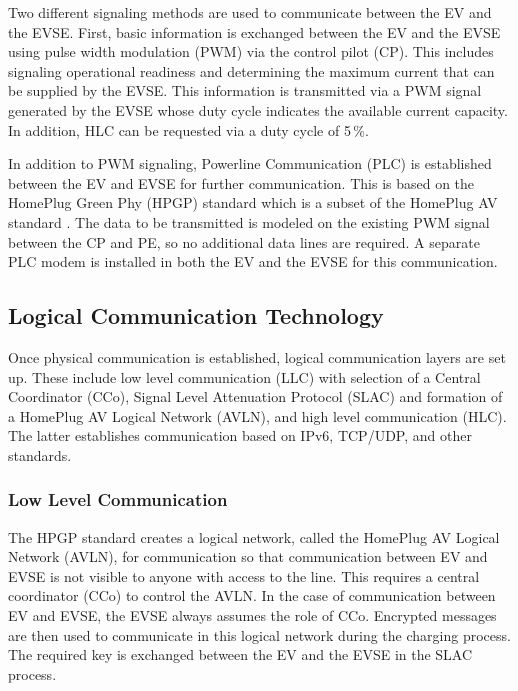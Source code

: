 \documentclass[sigconf]{acmart}
\begin{document}
Two different signaling methods are used to communicate between the EV and the EVSE. First, basic information is exchanged between the EV and the EVSE using pulse width modulation (PWM) via the control pilot (CP). This includes signaling operational readiness and determining the maximum current that can be supplied by the EVSE. This information is transmitted via a PWM signal generated by the EVSE whose duty cycle indicates the available current capacity. In addition, HLC can be requested via a duty cycle of 5\,\%. \citep[pp.\,36--43]{bahrami-ev-2020}

In addition to PWM signaling, Powerline Communication (PLC) is established between the EV and EVSE for further communication. This is based on the HomePlug Green Phy (HPGP) standard which is a subset of the HomePlug AV standard \citep[p.\,11]{homeplug-green-phy-whitepaper}. The data to be transmitted is modeled on the existing PWM signal between the CP and PE, so no additional data lines are required. A separate PLC modem is installed in both the EV and the EVSE for this communication.

\subsection{Logical Communication Technology}
Once physical communication is established, logical communication layers are set up. These include low level communication (LLC) with selection of a Central Coordinator (CCo), Signal Level Attenuation Protocol (SLAC) and formation of a HomePlug AV Logical Network (AVLN), and high level communication (HLC). The latter establishes communication based on IPv6, TCP/UDP, and other standards. \citep[p.\,49]{bahrami-ev-2020}

\subsubsection{Low Level Communication}
The HPGP standard creates a logical network, called the HomePlug AV Logical Network (AVLN), for communication so that communication between EV and EVSE is not visible to anyone with access to the line. This requires a central coordinator (CCo) to control the AVLN. In the case of communication between EV and EVSE, the EVSE always assumes the role of CCo. Encrypted messages are then used to communicate in this logical network during the charging process. The required key is exchanged between the EV and the EVSE in the SLAC process. \citep[pp.\,7--8]{homeplug-av-whitepaper}
\end{document}
